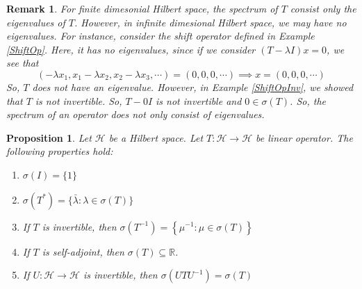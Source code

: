 \documentclass{report}
\newtheorem{prop}{Proposition}
\newtheorem{rem}{Remark}
\begin{document}
\begin{rem}
For finite dimesonial Hilbert space, the spectrum of $T$ consist only the eigenvalues of $T$. However, in infinite dimesional Hilbert space, we may have no eigenvalues. For instance, consider the shift operator defined in Example \ref{ShiftOp}. Here, it has no eigenvalues, since if we consider $(T-\lambda I)x=0$, we see that
$$
(-\lambda x_{1}, x_{1}-\lambda x_{2}, x_{2}-\lambda x_{3},\cdots)=(0,0,0,\cdots) \implies x = (0,0,0,\cdots)
$$
So, $T$ does not have an eigenvalue. However, in Example \ref{ShiftOpInv}, we showed that $T$ is not invertible. So, $T-0I$ is not invertible and $0\in\sigma(T)$. So, the spectrum of an operator does not only consist of eigenvalues.
\end{rem}

\begin{prop}
  Let $\mathcal{H}$ be a Hilbert space. Let $T:\mathcal{H}\to\mathcal{H}$ be linear operator. The following properties hold:
  \begin{enumerate}
    \item $\sigma(I) = \{1\}$
    \item $\sigma\left(T^{*}\right)=\{\bar{\lambda}: \lambda \in \sigma(T)\}$
    \item If $T$ is invertible, then $\sigma\left(T^{-1}\right)=\left\{\mu^{-1}: \mu \in \sigma(T)\right\}$
    \item If $T$ is self-adjoint, then $\sigma(T)\subseteq\mathbb{R}$.
    \item If $U:\mathcal{H}\to\mathcal{H}$ is invertible, then $\sigma(UTU^{-1})=\sigma(T)$
  \end{enumerate}
\end{prop}
\end{document}
